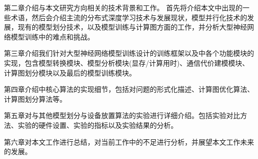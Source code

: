 第二章介绍与本文研究方向相关的技术背景和工作。
首先将介绍本文中出现的一些术语，然后会介绍主流的分布式深度学习技术与发展现状，模型并行化技术的发展，现有的模型划分技术，以及模型训练与计算图方面的工作，并分析大型神经网络模型训练中的难点和挑战。

第三章介绍我们针对大型神经网络模型训练设计的训练框架\sys 以及\sys 中各个功能模块的实现，包含模型转换模块、模型分析模块(显存/计算用时)、通信代价建模模块、计算图划分模块以及最后的模型训练模块。

第四章介绍\sys 中核心算法的实现细节，包括对问题的形式化描述、计算图优化算法、计算图划分算法等。

第五章对\sys 与其他模型划分与设备放置算法的实验进行详细介绍。包括实验对比方法、实验的硬件设置、实验的指标以及实验结果的分析。

第六章对本文工作进行总结，对当前工作中的不足进行分析，并展望本文工作未来的发展。